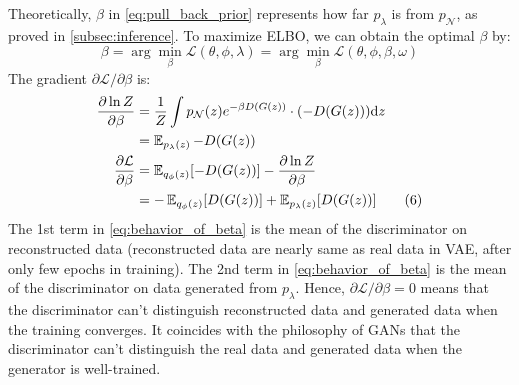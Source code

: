 Theoretically, $\beta$ in \cref{eq:pull_back_prior} represents how far $p_\lambda$ is from $p_\mathcal{N}$, as proved in \cref{subsec:inference}.
To maximize ELBO, we can obtain the optimal $\beta$ by:
\begin{equation}
	\beta = \arg \min_{\beta} \mathcal{L}(\theta, \phi, \lambda) = \arg \min_{\beta} \mathcal{L}(\theta, \phi, \beta, \omega) \tag{5}
\end{equation}
The gradient $\partial \mathcal{L}/\partial \beta$ is:
\begin{align*}\label{eq:behavior_of_beta}
\frac{\partial \ln Z}{\partial \beta} &= \frac{1}{Z} \int p_\mathcal{N}(z) e^{-\beta D(G(z))} \cdot (-D(G(z))) \mathrm{d} z \\
&=  \operatorname{\mathbb{E}}_{p_\lambda(z)} - D(G(z))  \\
\frac{\partial \mathcal{L}}{\partial \beta} &= \operatorname{\mathbb{E}}_{q_\phi(z)}[ -D(G(z))] - \frac{\partial \ln Z}{\partial \beta} \\
&= - \operatorname{\mathbb{E}}_{q_\phi(z)}[ D(G(z))] + \operatorname{\mathbb{E}}_{p_\lambda(z)}[ D(G(z))]   \tag{6}
\end{align*}
The 1st term in \cref{eq:behavior_of_beta} is the mean of the discriminator on reconstructed data (reconstructed data are nearly same as real data in VAE, after only few epochs in training). 
The 2nd term in \cref{eq:behavior_of_beta} is the mean of the discriminator on data generated from $p_\lambda$. 
Hence, $\partial \mathcal{L}/\partial \beta = 0$ means that the discriminator can't distinguish reconstructed data and generated data when the training converges. It coincides with the philosophy of GANs that the discriminator can't distinguish the real data and generated data when the generator is well-trained.

